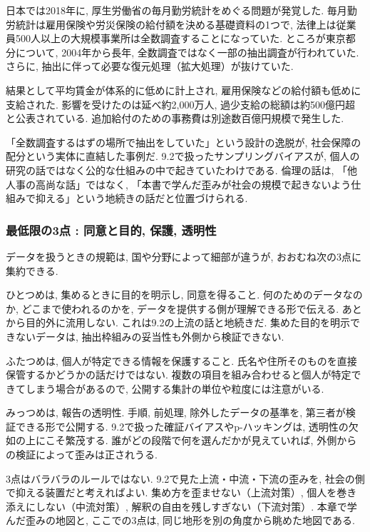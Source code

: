 日本では2018年に, 厚生労働省の毎月勤労統計をめぐる問題が発覚した.
毎月勤労統計は雇用保険や労災保険の給付額を決める基礎資料の1つで, 法律上は従業員500人以上の大規模事業所は全数調査することになっていた.
ところが東京都分について, 2004年から長年, 全数調査ではなく一部の抽出調査が行われていた.
さらに, 抽出に伴って必要な復元処理（拡大処理）が抜けていた.

結果として平均賃金が体系的に低めに計上され, 雇用保険などの給付額も低めに支給された.
影響を受けたのは延べ約2{,}000万人, 過少支給の総額は約500億円超と公表されている.
追加給付のための事務費は別途数百億円規模で発生した.

「全数調査するはずの場所で抽出をしていた」という設計の逸脱が, 社会保障の配分という実体に直結した事例だ.
9.2で扱ったサンプリングバイアスが, 個人の研究の話ではなく公的な仕組みの中で起きていたわけである.
倫理の話は, 「他人事の高尚な話」ではなく, 「本書で学んだ歪みが社会の規模で起きないよう仕組みで抑える」という地続きの話だと位置づけられる.

\subsubsection*{最低限の3点 : 同意と目的, 保護, 透明性}

データを扱うときの規範は, 国や分野によって細部が違うが, おおむね次の3点に集約できる.

ひとつめは, 集めるときに目的を明示し, 同意を得ること.
何のためのデータなのか, どこまで使われるのかを, データを提供する側が理解できる形で伝える.
あとから目的外に流用しない.
これは9.2の上流の話と地続きだ.
集めた目的を明示できないデータは, 抽出枠組みの妥当性も外側から検証できない.

ふたつめは, 個人が特定できる情報を保護すること.
氏名や住所そのものを直接保管するかどうかの話だけではない.
複数の項目を組み合わせると個人が特定できてしまう場合があるので, 公開する集計の単位や粒度には注意がいる.

みっつめは, 報告の透明性. 手順, 前処理, 除外したデータの基準を, 第三者が検証できる形で公開する.
9.2で扱った確証バイアスやp-ハッキングは, 透明性の欠如の上にこそ繁茂する.
誰がどの段階で何を選んだかが見えていれば, 外側からの検証によって歪みは正されうる.

3点はバラバラのルールではない.
9.2で見た上流・中流・下流の歪みを, 社会の側で抑える装置だと考えればよい.
集め方を歪ませない（上流対策）, 個人を巻き添えにしない（中流対策）, 解釈の自由を残しすぎない（下流対策）.
本章で学んだ歪みの地図と, ここでの3点は, 同じ地形を別の角度から眺めた地図である.

